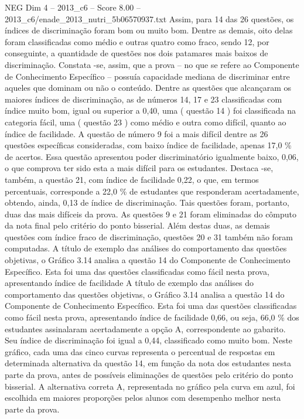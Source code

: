 \begin{textsample}{NEG Dim 4 – 2013\_c6 – Score 8.00 – 2013\_c6/enade\_2013\_nutri\_5b06570937.txt}
Assim, para 14 das 26 questões, os índices de discriminação foram bom ou muito bom.
Dentre as demais, oito delas foram classificadas como médio e outras quatro como fraco, sendo 12, por conseguinte, a quantidade de questões nos dois patamares mais baixos de discriminação.
Constata -se, assim, que a prova – no que se refere ao Componente de Conhecimento Específico – possuía capacidade mediana de discriminar entre aqueles que dominam ou não o conteúdo.
Dentre as questões que alcançaram os maiores índices de discriminação, as de números 14, 17 e 23 classificadas com índice muito bom, igual ou superior a 0,40, uma ( questão 14 ) foi classificada na categoria fácil, uma ( questão 23 ) como médio e outra como difícil, quanto ao índice de facilidade.
A questão de número 9 foi a mais difícil dentre as 26 questões específicas consideradas, com baixo índice de facilidade, apenas 17,0 \% de acertos.
Essa questão apresentou poder discriminatório igualmente baixo, 0,06, o que comprova ter sido esta a mais difícil para os estudantes.
Destaca -se, também, a questão 21, com índice de facilidade 0,22, o que, em termos percentuais, corresponde a 22,0 \% de estudantes que responderam acertadamente, obtendo, ainda, 0,13 de índice de discriminação.
Tais questões foram, portanto, duas das mais difíceis da prova.
As questões 9 e 21 foram eliminadas do cômputo da nota final pelo critério do ponto bisserial.
Além destas duas, as demais questões com índice fraco de discriminação, questões 20 e 31 também não foram computadas.
A título de exemplo das análises do comportamento das questões objetivas, o Gráfico 3.14 analisa a questão 14 do Componente de Conhecimento Específico.
Esta foi uma das questões classificadas como fácil nesta prova, apresentando índice de facilidade A título de exemplo das análises do comportamento das questões objetivas, o Gráfico 3.14 analisa a questão 14 do Componente de Conhecimento Específico.
Esta foi uma das questões classificadas como fácil nesta prova, apresentando índice de facilidade 0,66, ou seja, 66,0 \% dos estudantes assinalaram acertadamente a opção A, correspondente ao gabarito.
Seu índice de discriminação foi igual a 0,44, classificado como muito bom.
Neste gráfico, cada uma das cinco curvas representa o percentual de respostas em determinada alternativa da questão 14, em função da nota dos estudantes nesta parte da prova, antes de possíveis eliminações de questões pelo critério do ponto bisserial.
A alternativa correta A, representada no gráfico pela curva em azul, foi escolhida em maiores proporções pelos alunos com desempenho melhor nesta parte da prova.

\end{textsample}
